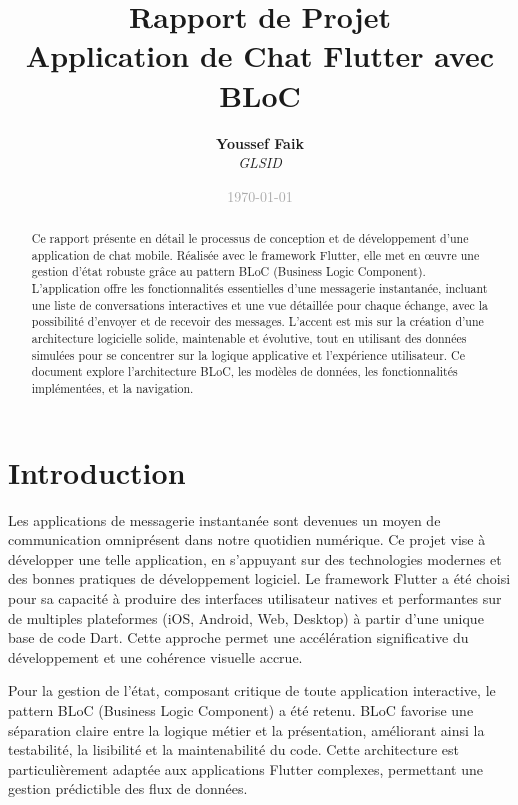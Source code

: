\documentclass[12pt,a4paper]{article}
\title{\textcolor{primaryblue}{\textbf{Rapport de Projet \\ Application de Chat Flutter avec BLoC}}}
\author{
    \textbf{Youssef Faik} \\ 
    \textit{GLSID} \\ 
}
\date{\textcolor{darkgray}{\today}}
\begin{document}
\maketitle
\thispagestyle{empty}

\begin{abstract}
\begin{infobox}[title=Résumé du Projet]
Ce rapport présente en détail le processus de conception et de développement d'une application de chat mobile. Réalisée avec le framework Flutter, elle met en œuvre une gestion d'état robuste grâce au pattern BLoC (Business Logic Component). L'application offre les fonctionnalités essentielles d'une messagerie instantanée, incluant une liste de conversations interactives et une vue détaillée pour chaque échange, avec la possibilité d'envoyer et de recevoir des messages. L'accent est mis sur la création d'une architecture logicielle solide, maintenable et évolutive, tout en utilisant des données simulées pour se concentrer sur la logique applicative et l'expérience utilisateur. Ce document explore l'architecture BLoC, les modèles de données, les fonctionnalités implémentées, et la navigation.
\end{infobox}
\end{abstract}

\newpage
\tableofcontents
\newpage

\section{Introduction}
Les applications de messagerie instantanée sont devenues un moyen de communication omniprésent dans notre quotidien numérique. Ce projet vise à développer une telle application, en s'appuyant sur des technologies modernes et des bonnes pratiques de développement logiciel. Le framework Flutter a été choisi pour sa capacité à produire des interfaces utilisateur natives et performantes sur de multiples plateformes (iOS, Android, Web, Desktop) à partir d'une unique base de code Dart. Cette approche permet une accélération significative du développement et une cohérence visuelle accrue.

Pour la gestion de l'état, composant critique de toute application interactive, le pattern BLoC (Business Logic Component) a été retenu. BLoC favorise une séparation claire entre la logique métier et la présentation, améliorant ainsi la testabilité, la lisibilité et la maintenabilité du code. Cette architecture est particulièrement adaptée aux applications Flutter complexes, permettant une gestion prédictible des flux de données.
\end{document}
